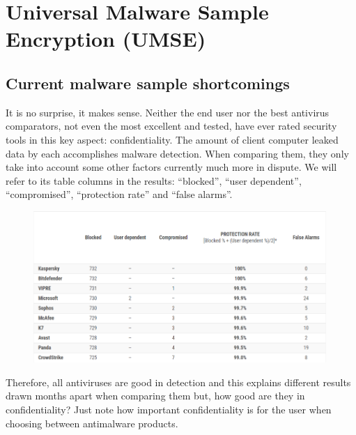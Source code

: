 \chapter{Universal Malware Sample Encryption (UMSE)}

\section{Current malware sample shortcomings}

It is no surprise, it makes sense. Neither the end user nor the best antivirus
comparators\cite{AVComparatives2020}\cite{AVTest}, not even the most excellent and tested, have ever rated security
tools in this key aspect: confidentiality. The amount of client computer
leaked data by each accomplishes malware detection. When comparing them, they
only take into account some other factors currently much more in dispute. We
will refer to its table columns in the results: ``blocked'', ``user
dependent'', ``compromised'', ``protection rate'' and ``false
alarms''\cite{AVComparativesResults2019}.
  
\begin{figure}[h]
  \centering
  \includegraphics[width=0.99\textwidth]{./figures/MalwareSample}
\end{figure}

Therefore, all antiviruses are good in detection and this explains different
results drawn months apart when comparing them but, how good are they in
confidentiality? Just note how important confidentiality is for the user when
choosing between antimalware products.

